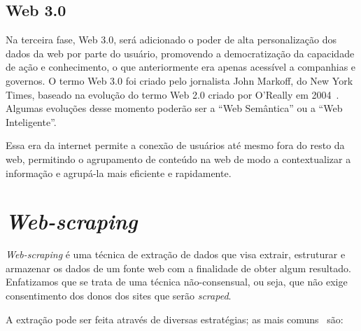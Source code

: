 \subsection{Web 3.0}

Na terceira fase, Web 3.0, será adicionado o poder de alta personalização dos dados da web por parte do usuário, promovendo a democratização da capacidade de ação e conhecimento, o que anteriormente era apenas acessível a companhias e governos.
O termo Web 3.0 foi criado pelo jornalista John Markoff, do New York Times, baseado na evolução do termo Web 2.0 criado por O'Really em 2004~\cite{Web32}. Algumas evoluções desse momento poderão ser a ``Web Semântica'' ou a ``Web Inteligente''.

Essa era da internet permite a conexão de usuários até mesmo fora do resto da web, permitindo o agrupamento de conteúdo na web de modo a contextualizar a informação e agrupá-la mais eficiente e rapidamente.

\section{\textit{Web-scraping}}

\textit{Web-scraping} é uma técnica de extração de dados que visa extrair, estruturar e armazenar os dados de um fonte web com a finalidade de obter algum resultado.
Enfatizamos que se trata de uma técnica não-consensual, ou seja, que não exige consentimento dos donos dos sites que serão \textit{scraped}.

A extração pode ser feita através de diversas estratégias; as mais comuns~\cite{Scraping1} são:

